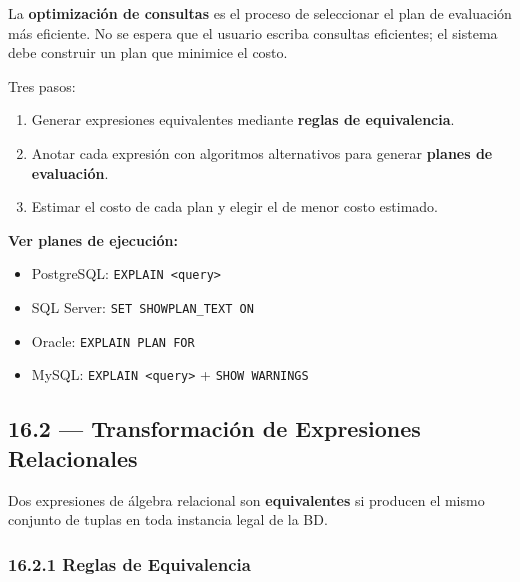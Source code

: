 \documentclass[11pt, a4paper]{article}
\begin{document}
La \textbf{optimización de consultas} es el proceso de seleccionar el plan de evaluación más eficiente. No se espera que el usuario escriba consultas eficientes; el sistema debe construir un plan que minimice el costo.

Tres pasos:
\begin{enumerate}[nosep]
	\item Generar expresiones equivalentes mediante \textbf{reglas de equivalencia}.
	\item Anotar cada expresión con algoritmos alternativos para generar \textbf{planes de evaluación}.
	\item Estimar el costo de cada plan y elegir el de menor costo estimado.
\end{enumerate}

\textbf{Ver planes de ejecución:}
\begin{itemize}[nosep]
	\item PostgreSQL: \texttt{EXPLAIN <query>}
	\item SQL Server: \texttt{SET SHOWPLAN\_TEXT ON}
	\item Oracle: \texttt{EXPLAIN PLAN FOR}
	\item MySQL: \texttt{EXPLAIN <query>} + \texttt{SHOW WARNINGS}
\end{itemize}

\subsection{16.2 --- Transformación de Expresiones Relacionales}

Dos expresiones de álgebra relacional son \textbf{equivalentes} si producen el mismo conjunto de tuplas en toda instancia legal de la BD.

\subsubsection{16.2.1 Reglas de Equivalencia}
\end{document}
